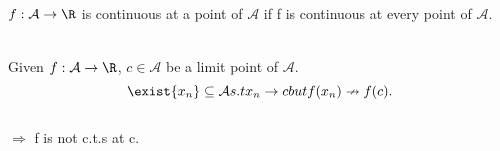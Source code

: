 \begin{definition}
    $f:\mathcal{A}\rightarrow\R$ is continuous at a point of $\mathcal{A}$ if f is continuous at every point of $\mathcal{A}$.
\end{definition}
 \\
Given $f: \mathcal{A}\rightarrow \R$, $c \in \mathcal{A}$ be a limit point of $\mathcal{A}$. \\
 \[
\exist \{x_n\} \subseteq \mathcal{A} s.t x_n \rightarrow c but f(x_n) \nrightarrow f(c).
\] \\
$\Rightarrow$ f is not c.t.s at c.
